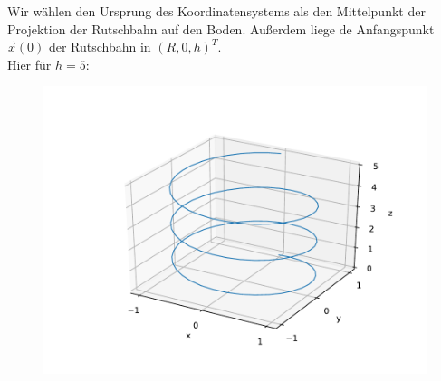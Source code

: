 \documentclass{theozettel}
\begin{document}
Wir wählen den Ursprung des Koordinatensystems als den Mittelpunkt der Projektion der Rutschbahn auf den Boden. Außerdem liege de Anfangspunkt $\vec{x}(0)$ der Rutschbahn in $(R, 0, h)^{T}$. \\ Hier für $h = 5$: 
	\begin{figure}[H]
	\centering
		\includegraphics[scale=0.6]{plot_spiralrutsche.pdf}
	\end{figure}
	
\end{document}
